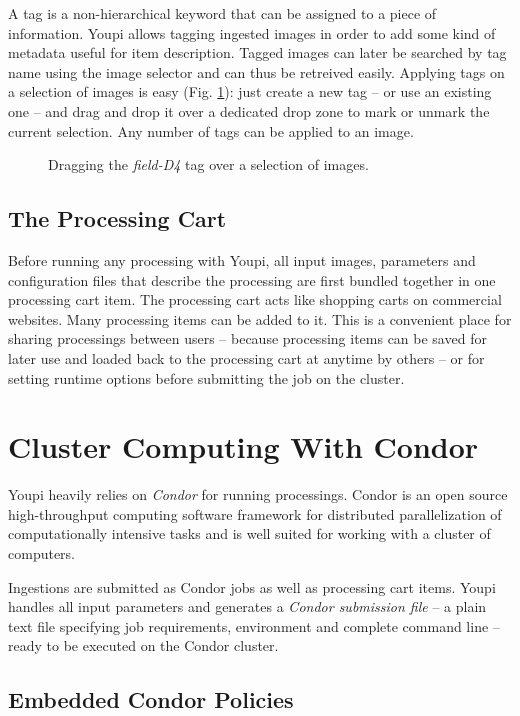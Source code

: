 \documentclass[11pt,twoside]{article}  %
\begin{document}
A tag is a non-hierarchical keyword that can be assigned to a piece of information. Youpi 
allows tagging ingested images in order to add some kind of metadata useful for item 
description. Tagged images can later be searched by tag name using the image selector and 
can thus be retreived easily. Applying tags on a selection of images is easy (Fig. \ref{fig:tags}): 
just create a new tag -- or use an existing one -- and drag and drop it over a dedicated 
drop zone to mark or unmark the current selection. Any number of tags can be applied to an 
image.

\begin{figure}[h]
\caption{Dragging the \emph{field-D4} tag over a selection of images.}\label{fig:tags}
\end{figure}

\subsection{The Processing Cart}

Before running any processing with Youpi, all input images, parameters and configuration 
files that describe the processing are first bundled together in one processing cart item. 
The processing cart acts like shopping carts on commercial websites. Many processing items 
can be added to it. This is a convenient place for sharing processings between users -- because 
processing items can be saved for later use and loaded back to the processing cart at anytime 
by others -- or for setting runtime options before submitting the job on the cluster.

\section{Cluster Computing With Condor}

Youpi heavily relies on \emph{Condor} for running processings. Condor is an open source 
high-throughput computing software framework for distributed parallelization of computationally 
intensive tasks and is well suited for working with a cluster of computers.

Ingestions are submitted as Condor jobs as well as processing cart items. Youpi handles 
all input parameters and generates a \emph{Condor submission file} -- a plain text file 
specifying job requirements, environment and complete command line -- ready to be executed 
on the Condor cluster.

\subsection{Embedded Condor Policies}
\end{document}
